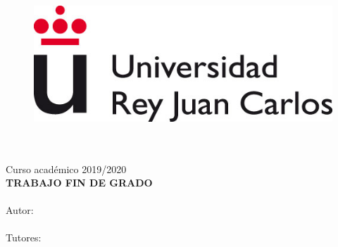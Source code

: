 \documentclass[
12pt, %
spanish, %
onehalfspacing, %
parskip, %
headsepline, %
openany %
]{MastersDoctoralThesis} %
\author{José Miguel García Benayas} %
\begin{document}
\frontmatter %

\pagestyle{plain} %


\begin{titlepage}
\begin{center}

\vspace*{.01\textheight}
\begin{figure}
\begin{center}
\includegraphics[scale=0.5]{Figures/logo-urjc}
\end{center}
\end{figure}
{\Large \MakeUppercase{\facname}}\\[0.5cm]
{\large \MakeUppercase{\degreename}}\\[0.5cm] %
{\large Curso académico 2019/2020}\\[1.5cm] %
{\large \textbf{TRABAJO FIN DE GRADO}}\\[0.5cm] %

{\Large \textbf{\MakeUppercase{\ttitle}}}\\[5cm] %

{\normalsize Autor:\\{\authorname}}\\[0.5cm]  %

{\normalsize Tutores:\\{\supname}}\\ %


\end{center}
\end{titlepage}
\end{document}
